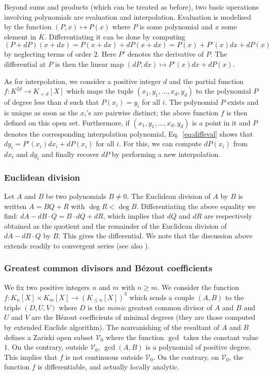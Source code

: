 \documentclass{lms}
\begin{document}
Beyond sums and products (which can be treated as before), two basic 
operations involving polynomials are evaluation and interpolation.
Evaluation is modelised by the function $(P,x) \mapsto P(x)$ where
$P$ is some polynomial and $x$ some element in $K$. Differentiating
it can be done by computing
\begin{equation}
\label{eq:diffeval}
(P + dP)(x + dx) = P(x + dx) + dP(x + dx) = P(x) + P'(x) dx + dP(x)
\end{equation}
by neglecting terms of order $2$. Here $P'$ denotes the derivative of 
$P$. The differential at $P$ is then the linear map $(dP, dx) \mapsto 
P'(x) dx + dP(x)$.

As for interpolation, we consider a positive integer $d$ and the partial 
function $f : K^{2d} \to K_{< d}[X]$ which maps the tuple $(x_1, y_1, 
\ldots, x_d, y_d)$ to the polynomial $P$ of degree less than $d$ such 
that $P(x_i) = y_i$ for all $i$. The polynomial $P$ exists and is unique 
as soon as the $x_i$'s are pairwise distinct; the above function $f$ is 
then defined on this open set. Furthermore, if $(x_1, y_1, \ldots, x_d, 
y_d)$ is a point in it and $P$ denotes the corresponding interpolation 
polynomial, Eq.~\eqref{eq:diffeval} shows that $d y_i = P'(x_i) dx_i + 
dP(x_i)$ for all $i$. For this, we can compute $dP(x_i)$ from $d x_i$ 
and $d y_i$ and finally recover $dP$ by performing a new interpolation.

\subsubsection*{Euclidean division}

Let $A$ and $B$ be two polynomials $B \neq 0$. The Euclidean division of 
$A$ by $B$ is written $A = BQ + R$ with $\deg R < \deg B$. 
Differentiating the above equality we find:
$dA - dB \cdot Q = B \cdot dQ + dR$,
which implies that $dQ$ and $dR$ are respectively obtained as the 
quotient and the remainder of the Euclidean division of $dA - dB \cdot 
Q$ by $B$. This gives the differential. We note that the discussion 
above extends readily to convergent series (see also 
\cite{Caruso-Lubicz}).

\subsubsection*{Greatest common divisors and B\'ezout coefficients}

We fix two positive integers $n$ and $m$ with $n \geq m$. We consider the 
function $f : K_n[X] \times K_m[X] \to (K_{\leq n}[X])^3$ which sends a 
couple $(A,B)$ to the triple $(D, U, V)$ where $D$ is the \emph{monic} 
greatest common divisor of $A$ and $B$ and $U$ and $V$ are the B\'ezout 
coefficients of minimal degrees (they are those computed by extended 
Euclide algorithm).
The nonvanishing of the resultant of $A$ and $B$ defines a Zariski open 
subset $\mathcal V_0$ where the function $\gcd$ takes the constant value 
$1$. On the contrary, outside $\mathcal V_0$, $\gcd(A,B)$ is a polynomial 
of positive degree. This implies that $f$ is not continuous outside 
$\mathcal V_0$. On the contrary, on $\mathcal V_0$, the function $f$ is
differentiable, and actually locally analytic.
\end{document}
